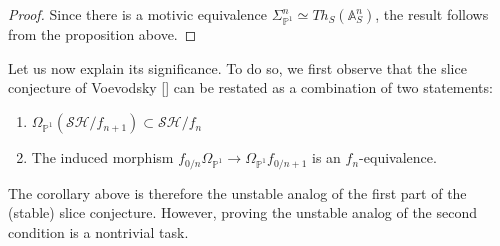       \begin{proof}
Since there is a motivic equivalence $\Sigma ^n_{\mathbb{P}^1}\simeq Th_S(\mathbb{A}^n_S)$, the result follows from the proposition above. 
\end{proof}

Let us now explain its significance. To do so, we first observe that the slice conjecture of Voevodsky [\cite{voevodsky2002possible}] can be restated as a combination of two statements: 



\begin{enumerate}
    \item $\Omega_{\mathbb{P}^1}(\mathcal{SH}/f_{n+1})\subset\mathcal{SH}/f_n $
    \item The induced morphism $f_{0/n}\Omega_{\mathbb{P}^1}\to \Omega_{\mathbb{P}^1}{f_{0/n+1}}$ is an $f_n$-equivalence.
\end{enumerate}

The corollary above is therefore the unstable analog of the first part of the (stable) slice conjecture. However, proving the unstable analog of the second condition is a nontrivial task.

